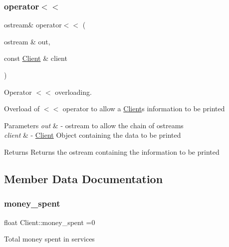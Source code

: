 \subsubsection{\texorpdfstring{operator$<$$<$}{operator<<}}
{\footnotesize\ttfamily ostream\& operator$<$$<$ (\begin{DoxyParamCaption}\item[{ostream \&}]{out,  }\item[{const \hyperlink{class_client}{Client} \&}]{client }\end{DoxyParamCaption})\hspace{0.3cm}{\ttfamily [friend]}}



Operator $<$$<$ overloading. 

Overload of $<$$<$ operator to allow a \hyperlink{class_client}{Client}\textquotesingle{}s information to be printed


\begin{DoxyParams}{Parameters}
{\em out} & -\/ ostream to allow the chain of ostreams \\
\hline
{\em client} & -\/ \hyperlink{class_client}{Client} Object containing the data to be printed \\
\hline
\end{DoxyParams}
\begin{DoxyReturn}{Returns}
Returns the ostream containing the information to be printed 
\end{DoxyReturn}


\subsection{Member Data Documentation}
\mbox{\label{class_client_a9d5dc70a6eee2fded8217a7983fe5fd0}} 
\subsubsection{\texorpdfstring{money\+\_\+spent}{money\_spent}}
{\footnotesize\ttfamily float Client\+::money\+\_\+spent =0\hspace{0.3cm}{\ttfamily [protected]}}

Total money spent in services \mbox{\label{class_client_a1c94dc96a56cb5032573fb1d528517c2}} 
